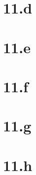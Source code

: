  \chapter{11.d}

 \chapter{11.e}

 \chapter{11.f}

 \chapter{11.g}

 \chapter{11.h}

















